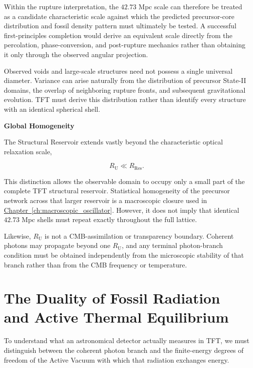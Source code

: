 Within the rupture interpretation, the $42.73$ Mpc scale can therefore be treated as a candidate characteristic scale against which the predicted precursor-core distribution and fossil density pattern must ultimately be tested. A successful first-principles completion would derive an equivalent scale directly from the percolation, phase-conversion, and post-rupture mechanics rather than obtaining it only through the observed angular projection.

Observed voids and large-scale structures need not possess a single universal diameter. Variance can arise naturally from the distribution of precursor State-II domains, the overlap of neighboring rupture fronts, and subsequent gravitational evolution. TFT must derive this distribution rather than identify every structure with an identical spherical shell.

\vspace{0.5em}

\noindent\textbf{Global Homogeneity}

The Structural Reservoir extends vastly beyond the characteristic optical relaxation scale,

\begin{equation}
    R_{\mathrm U}
    \ll
    R_{\mathrm{Res}}.
\end{equation}

This distinction allows the observable domain to occupy only a small part of the complete TFT structural reservoir. Statistical homogeneity of the precursor network across that larger reservoir is a macroscopic closure used in
\hyperref[ch:macroscopic_oscillator]{Chapter~\ref*{ch:macroscopic_oscillator}}.
However, it does not imply that identical $42.73$ Mpc shells must repeat exactly throughout the full lattice.

Likewise, $R_{\mathrm U}$ is not a CMB-assimilation or transparency boundary. Coherent photons may propagate beyond one $R_{\mathrm U}$, and any terminal photon-branch condition must be obtained independently from the microscopic stability of that branch rather than from the CMB frequency or temperature.

\section{The Duality of Fossil Radiation and Active Thermal Equilibrium}
\label{sec:vacuum_radiation_duality}

To understand what an astronomical detector actually measures in TFT, we must distinguish between the coherent photon branch and the finite-energy degrees of freedom of the Active Vacuum with which that radiation exchanges energy.

